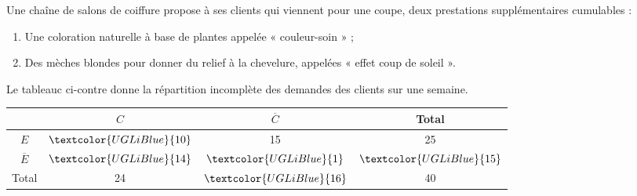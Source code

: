 \documentclass[a4paper,11pt,exos]{nsi} %
\begin{document}
\maketitle

\exo{}
Une chaîne de salons de coiffure propose à ses clients qui viennent pour une coupe, deux prestations supplémentaires cumulables :
\begin{enumerate}[label=\textbullet]
    \item Une coloration naturelle à base de plantes appelée « couleur-soin » ;
    \item Des mèches blondes pour donner du relief à la chevelure, appelées « effet coup de soleil ».
\end{enumerate}
Le tableauc ci-contre donne la répartition incomplète des demandes des clients sur une semaine.\\

{
    \begin{tabular}{|c|c|c|c|}
        \hline
        \rowcolor{UGLiOrange}& $C$ & $\overline{C}$ & Total\\
        \hline
        \cellcolor{UGLiOrange}$E$ & $ \textcolor{UGLiBlue}{10} $ & 15 & 25\\
        \hline
        \cellcolor{UGLiOrange}$\overline{E}$ &$ \textcolor{UGLiBlue}{14} $ & $ \textcolor{UGLiBlue}{1} $  & $ \textcolor{UGLiBlue}{15} $\\
        \hline
        \cellcolor{UGLiOrange}Total & 24 & $ \textcolor{UGLiBlue}{16} $ & 40\\
        \hline
    \end{tabular}
}
\end{document}
